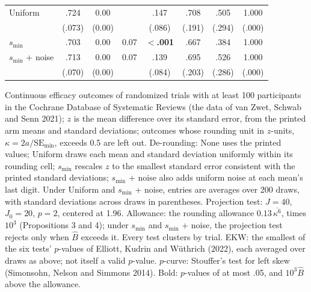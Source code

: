 \begin{table}[!htbp]
\begin{threeparttable}
\begin{tabular}{lccccccc}
Uniform & .724 & 0.00 &  & .147 & .708 & .505 & 1.000 \\
 & (.073) & (0.00) &  & (.086) & (.191) & (.294) & (.000) \\
$s_{\min}$ & .703 & 0.00 & 0.07 & \textbf{$<$.001} & .667 & .384 & 1.000 \\
$s_{\min}$ + noise & .713 & 0.00 & 0.07 & .139 & .695 & .526 & 1.000 \\
 & (.070) & (0.00) &  & (.084) & (.203) & (.286) & (.000) \\
\bottomrule
\end{tabular}
\begin{tablenotes}[flushleft]\footnotesize
\item Continuous efficacy outcomes of randomized trials with at least 100 participants in the Cochrane Database of Systematic Reviews (the data of van Zwet, Schwab and Senn 2021); $z$ is the mean difference over its standard error, from the printed arm means and standard deviations; outcomes whose rounding unit in $z$-units, $\kappa = 2a/\mathrm{SE}_{\min}$, exceeds 0.5 are left out. De-rounding: None uses the printed values; Uniform draws each mean and standard deviation uniformly within its rounding cell; $s_{\min}$ rescales $z$ to the smallest standard error consistent with the printed standard deviations; $s_{\min}$ + noise also adds uniform noise at each mean's last digit. Under Uniform and $s_{\min}$ + noise, entries are averages over 200 draws, with standard deviations across draws in parentheses. Projection test: $J = 40$, $J_0 = 20$, $p = 2$, centered at 1.96. Allowance: the rounding allowance $0.13\,\overline{\kappa^6}$, times $10^3$ (Propositions 3 and 4); under $s_{\min}$ and $s_{\min}$ + noise, the projection test rejects only when $\hat B$ exceeds it. Every test clusters by trial. EKW: the smallest of the six tests' $p$-values of Elliott, Kudrin and W\"uthrich (2022), each averaged over draws as above; not itself a valid $p$-value. $p$-curve: Stouffer's test for left skew (Simonsohn, Nelson and Simmons 2014). Bold: $p$-values of at most .05, and $10^3 \hat B$ above the allowance.
\end{tablenotes}
\end{threeparttable}
\end{table}
